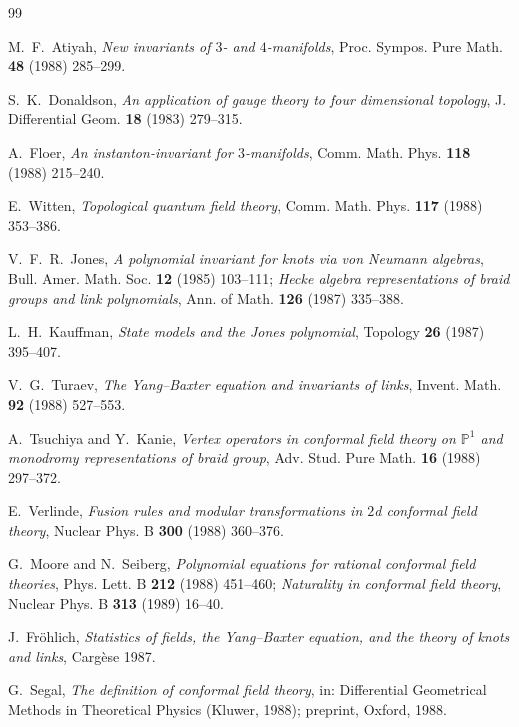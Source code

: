\begin{thebibliography}{99}\small

 M.~F.~Atiyah, \emph{New invariants of $3$- and $4$-manifolds},
Proc. Sympos. Pure Math. \textbf{48} (1988) 285--299.

 S.~K.~Donaldson, \emph{An application of gauge theory to four
dimensional topology}, J. Differential Geom. \textbf{18} (1983) 279--315.

 A.~Floer, \emph{An instanton-invariant for $3$-manifolds},
Comm. Math. Phys. \textbf{118} (1988) 215--240.

 E.~Witten, \emph{Topological quantum field theory},
Comm. Math. Phys. \textbf{117} (1988) 353--386.

 V.~F.~R.~Jones, \emph{A polynomial invariant for knots via von Neumann
algebras}, Bull. Amer. Math. Soc. \textbf{12} (1985) 103--111;
\emph{Hecke algebra representations of braid groups and link polynomials},
Ann. of Math. \textbf{126} (1987) 335--388.

 L.~H.~Kauffman, \emph{State models and the Jones polynomial},
Topology \textbf{26} (1987) 395--407.

 V.~G.~Turaev, \emph{The Yang--Baxter equation and invariants of links},
Invent. Math. \textbf{92} (1988) 527--553.

 A.~Tsuchiya and Y.~Kanie, \emph{Vertex operators in conformal field theory
on $\mathbb P^1$ and monodromy representations of braid group},
Adv. Stud. Pure Math. \textbf{16} (1988) 297--372.

 E.~Verlinde, \emph{Fusion rules and modular transformations in
$2$d conformal field theory}, Nuclear Phys. B \textbf{300} (1988) 360--376.

 G.~Moore and N.~Seiberg, \emph{Polynomial equations for rational
conformal field theories}, Phys. Lett. B \textbf{212} (1988) 451--460;
\emph{Naturality in conformal field theory}, Nuclear Phys. B \textbf{313} (1989) 16--40.

 J.~Fr\"ohlich, \emph{Statistics of fields, the Yang--Baxter equation,
and the theory of knots and links}, Carg\`ese 1987.

 G.~Segal, \emph{The definition of conformal field theory},
in: Differential Geometrical Methods in Theoretical Physics (Kluwer, 1988);
preprint, Oxford, 1988.


\end{thebibliography}
